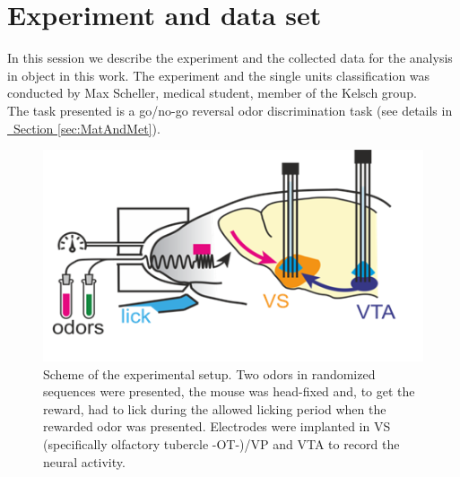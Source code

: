 \section{Experiment and data set}
\label{sec:Dataset}
\begin{framed}
In this session we describe the experiment and the collected data for the analysis in object in this work. The experiment and the single units classification was conducted by Max Scheller, medical student, member of the Kelsch group.\\The task presented is a go/no-go reversal odor discrimination task (see details in \hyperref[sec:MatAndMet]{~Section \ref*{sec:MatAndMet}}).
\begin{figure}[H]
    \centering
    \includegraphics[scale=0.92]{figures/Experiment.png}
    \caption{Scheme of the experimental setup. Two odors in randomized sequences were presented, the mouse was head-fixed and, to get the reward, had to lick during the allowed licking period when the rewarded odor was presented. Electrodes were implanted in VS (specifically olfactory tubercle -OT-)/VP  and VTA to record the neural activity.}
    \label{fig:experiment}
\end{figure}

\end{framed}
